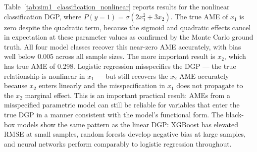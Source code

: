 \documentclass[12pt]{article}
\begin{document}
	Table~\ref{tab:sim1_classification_nonlinear} reports results for the nonlinear classification DGP, where $P(y=1) = \sigma(2x_1^2 + 3x_2)$. The true AME of $x_1$ is zero despite the quadratic term, because the sigmoid and quadratic effects cancel in expectation at these parameter values as confirmed by the Monte Carlo ground truth. All four model classes recover this near-zero AME accurately, with bias well below 0.005 across all sample sizes. The more important result is $x_2$, which has true AME of 0.298. Logistic regression misspecifies the DGP --- the true relationship is nonlinear in $x_1$ --- but still recovers the $x_2$ AME accurately because $x_2$ enters linearly and the misspecification in $x_1$ does not propagate to the $x_2$ marginal effect. This is an important practical result: AMEs from a misspecified parametric model can still be reliable for variables that enter the true DGP in a manner consistent with the model's functional form. The black-box models show the same pattern as the linear DGP: XGBoost has elevated RMSE at small samples, random forests develop negative bias at large samples, and neural networks perform comparably to logistic regression throughout.
	
\end{document}
